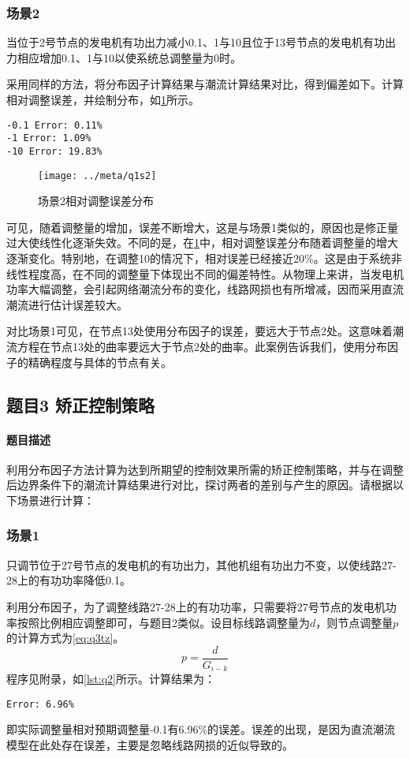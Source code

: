 \documentclass[a4paper,12pt]{article}
\begin{document}
    \subsubsection{场景2} 当位于2号节点的发电机有功出力减小0.1、1与10且位于13号节点的发电机有功出力相应增加0.1、1与10以使系统总调整量为0时。

    采用同样的方法，将分布因子计算结果与潮流计算结果对比，得到偏差如下。计算相对调整误差，并绘制分布，如\cref{fig:q1s2}所示。
    \begin{lstlisting}[style=Matlab-editor,basicstyle=\mlttfamily]
-0.1 Error: 0.11%
-1 Error: 1.09%
-10 Error: 19.83%
    \end{lstlisting}

    \begin{figure}[htbp]
      \texttt{[image: ../meta/q1s2]}
      \caption{场景2相对调整误差分布}
      \label{fig:q1s2}
    \end{figure}

    可见，随着调整量的增加，误差不断增大，这是与场景1类似的，原因也是修正量过大使线性化逐渐失效。不同的是，在\cref{fig:q1s2}中，相对调整误差分布随着调整量的增大逐渐变化。特别地，在调整10的情况下，相对误差已经接近20\%。这是由于系统非线性程度高，在不同的调整量下体现出不同的偏差特性。从物理上来讲，当发电机功率大幅调整，会引起网络潮流分布的变化，线路网损也有所增减，因而采用直流潮流进行估计误差较大。

    对比场景1可见，在节点13处使用分布因子的误差，要远大于节点2处。这意味着潮流方程在节点13处的曲率要远大于节点2处的曲率。此案例告诉我们，使用分布因子的精确程度与具体的节点有关。

    \subsection{题目3 矫正控制策略}
    \paragraph{题目描述} 利用分布因子方法计算为达到所期望的控制效果所需的矫正控制策略，并与在调整后边界条件下的潮流计算结果进行对比，探讨两者的差别与产生的原因。请根据以下场景进行计算：
    \subsubsection{场景1} 只调节位于27号节点的发电机的有功出力，其他机组有功出力不变，以使线路27-28上的有功功率降低0.1。

    利用分布因子，为了调整线路27-28上的有功功率，只需要将27号节点的发电机功率按照比例相应调整即可，与题目2类似。设目标线路调整量为$d$，则节点调整量$p$的计算方式为\cref{eq:q3tz}。
    \begin{equation}
      \label{eq:q3tz}
      p = \frac{d}{G_{i-k}}
    \end{equation}
    程序见附录，如\cref{lst:q2}所示。计算结果为：
    \begin{lstlisting}[style=Matlab-editor,basicstyle=\mlttfamily]
Error: 6.96%
    \end{lstlisting}
    即实际调整量相对预期调整量-0.1有6.96\%的误差。误差的出现，是因为直流潮流模型在此处存在误差，主要是忽略线路网损的近似导致的。
\end{document}
